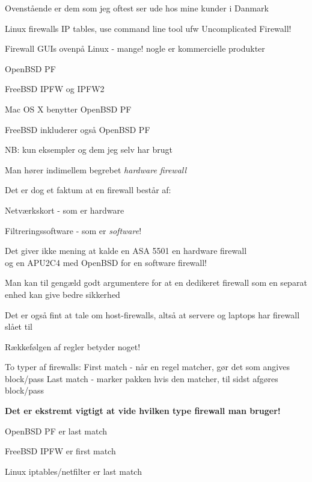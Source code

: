 \documentclass[Screen16to9,17pt]{foils}
\begin{document}
Ovenstående er dem som jeg oftest ser ude hos mine kunder i Danmark

\begin{list2}
\item Linux firewalls IP tables, use command line tool ufw Uncomplicated Firewall!
\item Firewall GUIs ovenpå Linux - mange!
nogle er kommercielle produkter
\item OpenBSD PF
\item FreeBSD IPFW og IPFW2 
\item Mac OS X benytter OpenBSD PF
\item FreeBSD inkluderer også OpenBSD PF
\end{list2}

NB: kun eksempler og dem jeg selv har brugt




\begin{list1}
\item Man hører indimellem begrebet \emph{hardware firewall}
\item Det er dog et faktum at en firewall består af:
\begin{list2}
\item Netværkskort - som er hardware
\item Filtreringssoftware - som er \emph{software}!
\end{list2}
\item Det giver ikke mening at kalde en ASA 5501 en hardware firewall\\
  og en APU2C4 med OpenBSD for en software firewall!
\item Man kan til gengæld godt argumentere for at en dedikeret
  firewall som en separat enhed kan give bedre sikkerhed
  \item Det er også fint at tale om host-firewalls, altså at servere og laptops har firewall slået til
\end{list1}








\begin{list1}
\item Rækkefølgen af regler betyder noget!
\begin{list2}
\item To typer af firewalls:
 First match - når en regel matcher, gør det som angives block/pass
 Last match  - marker pakken hvis den matcher, til sidst afgøres block/pass
\end{list2}
\item {\bf Det er ekstremt vigtigt at vide hvilken type firewall
    man bruger!}
\item OpenBSD PF er last match
\item FreeBSD IPFW er first match
\item Linux iptables/netfilter er last match
\end{list1}
\end{document}
